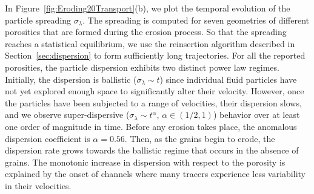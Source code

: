 \documentclass[preprint,10pt]{elsarticle}
\begin{document}
In Figure~\ref{fig:Eroding20Transport}(b), we plot the temporal
evolution of the particle spreading $\sigma_\lambda$.  The spreading is
computed for seven geometries of different porosities that are formed
during the erosion process.  So that the spreading reaches a statistical
equilibrium, we use the reinsertion algorithm described in
Section~\ref{sec:dispersion} to form sufficiently long trajectories.
For all the reported porosities, the particle dispersion exhibits two
distinct power law regimes.  Initially, the dispersion is ballistic
($\sigma_\lambda \sim t$) since individual fluid particles have not yet
explored enough space to significantly alter their velocity.  However,
once the particles have been subjected to a range of velocities, their
dispersion slows, and we observe super-dispersive ($\sigma_\lambda \sim
t^\alpha$, $\alpha \in (1/2,1)$) behavior over at least one order of
magnitude in time.  Before any erosion takes place, the anomalous
dispersion coefficient is $\alpha = 0.56$.  Then, as the grains begin to
erode, the dispersion rate grows towards the ballistic regime that
occurs in the absence of grains.  The monotonic increase in dispersion
with respect to the porosity is explained by the onset of channels where
many tracers experience less variability in their velocities.
\end{document}
